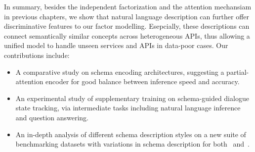 In summary, besides the independent factorization and the attention
mechansiam in previous chapters, we show that natural language
description can further offer discriminative features to our factor
modelling. Esepcially, these descriptions can connect semantically
similar concepts across heterogeneous APIs, thus allowing a unified
model to handle unseen services and APIs in data-poor cases. Our
contributions include:
\begin{itemize}
\item A comparative study
  on schema encoding architectures, suggesting a partial-attention
  encoder for good balance between inference speed and accuracy.
\item An experimental study of supplementary training on
  schema-guided dialogue state tracking, via intermediate tasks
  including natural language inference and question answering.
\item An in-depth analysis of different schema description styles on a new
  suite of benchmarking datasets with
  variations in schema description for both \sgdst~and~\multiwoz.
\end{itemize}















